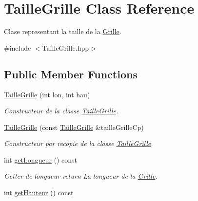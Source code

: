 \hypertarget{classTailleGrille}{\section{Taille\-Grille Class Reference}
\label{classTailleGrille}
}


Clase representant la taille de la \hyperlink{classGrille}{Grille}.  




{\ttfamily \#include $<$Taille\-Grille.\-hpp$>$}

\subsection*{Public Member Functions}
\begin{DoxyCompactItemize}
\item 
\hyperlink{classTailleGrille_aaa5fac2d88597b7c027971d7233bc09a}{Taille\-Grille} (int lon, int hau)
\begin{DoxyCompactList}\small\item\em Constructeur de la classe \hyperlink{classTailleGrille}{Taille\-Grille}. \end{DoxyCompactList}\item 
\hyperlink{classTailleGrille_a2c265fb5d27bb38eb4a45efdfe1dc08d}{Taille\-Grille} (const \hyperlink{classTailleGrille}{Taille\-Grille} \&taille\-Grille\-Cp)
\begin{DoxyCompactList}\small\item\em Constructeur par recopie de la classe \hyperlink{classTailleGrille}{Taille\-Grille}. \end{DoxyCompactList}\item 
\hypertarget{classTailleGrille_a02632ca8ed173717130ebef49eda84fa}{int \hyperlink{classTailleGrille_a02632ca8ed173717130ebef49eda84fa}{get\-Longueur} () const }\label{classTailleGrille_a02632ca8ed173717130ebef49eda84fa}

\begin{DoxyCompactList}\small\item\em Getter de longueur return La longueur de la \hyperlink{classGrille}{Grille}. \end{DoxyCompactList}\item 
\hypertarget{classTailleGrille_af654c9a4c95c68388cb8d7c1765db9c8}{int \hyperlink{classTailleGrille_af654c9a4c95c68388cb8d7c1765db9c8}{get\-Hauteur} () const }\label{classTailleGrille_af654c9a4c95c68388cb8d7c1765db9c8}


\end{DoxyCompactItemize}

